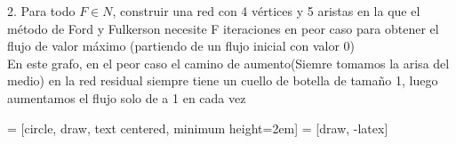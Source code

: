 \documentclass{article}
\begin{document}
2. Para todo $F \in N$, construir una red con 4 vértices y 5 aristas en la que el método de Ford y Fulkerson necesite F iteraciones en peor caso para obtener el flujo de valor máximo (partiendo de un flujo inicial con valor 0) \\ 

En este grafo, en el peor caso el camino de aumento(Siemre tomamos la arisa del medio) en la red residual siempre tiene un cuello de botella de tamaño 1, luego aumentamos el flujo solo de a 1 en cada vez

 = [circle, draw, text centered, minimum height=2em]
 = [draw, -latex]

\end{document}
